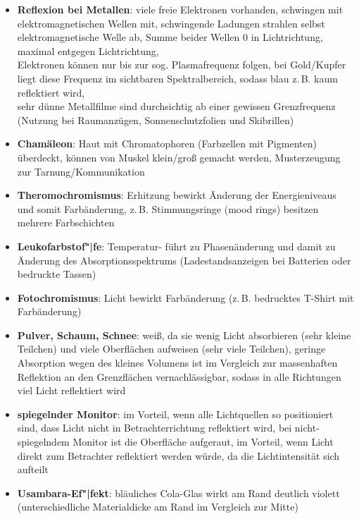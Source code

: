 \linie
\begin{itemize}
    \item
    \textbf{Reflexion bei Metallen}:
    viele freie Elektronen vorhanden, schwingen mit elektromagnetischen
    Wellen mit, schwingende Ladungen strahlen selbst elektromagnetische
    Welle ab, Summe beider Wellen $0$ in Lichtrichtung, maximal entgegen
    Lichtrichtung, \\
    Elektronen können nur bis zur sog. Plasmafrequenz folgen, bei Gold/Kupfer
    liegt diese Frequenz im sichtbaren Spektralbereich, sodass blau z.\,B.
    kaum reflektiert wird, \\
    sehr dünne Metallfilme sind durchsichtig ab einer gewissen Grenzfrequenz
    (Nutzung bei Raumanzügen, Sonnenschutzfolien und Skibrillen)
\end{itemize}
\linie
\begin{itemize}
    \item
    \textbf{Chamäleon}:
    Haut mit Chromatophoren (Farbzellen mit Pigmenten) überdeckt,
    können von Muskel klein/groß gemacht werden, Musterzeugung zur
    Tarnung/Kommunikation

    \item
    \textbf{Theromochromismus}:
    Erhitzung bewirkt Änderung der Energieniveaus und somit Farbänderung,
    z.\,B. Stimmungsringe (mood rings) besitzen mehrere Farbschichten

    \item
    \textbf{Leukofarbstof"|fe}:
    Temperatur- führt zu Phasenänderung und damit zu Änderung des
    Absorptionsspektrums (Ladestandsanzeigen bei Batterien
    oder bedruckte Tassen)

    \item
    \textbf{Fotochromismus}:
    Licht bewirkt Farbänderung (z.\,B. bedrucktes T-Shirt mit Farbänderung)
\end{itemize}
\linie
\begin{itemize}
    \item
    \textbf{Pulver, Schaum, Schnee}:
    weiß, da sie wenig Licht absorbieren (sehr kleine Teilchen) und
    viele Oberflächen aufweisen (sehr viele Teilchen), geringe Absorption wegen
    des kleines Volumens ist im Vergleich zur massenhaften Reflektion an
    den Grenzflächen vernachlässigbar, sodass in alle Richtungen viel
    Licht reflektiert wird
\end{itemize}
\linie
\begin{itemize}
    \item
    \textbf{spiegelnder Monitor}:
    im Vorteil, wenn alle Lichtquellen so positioniert sind, dass Licht nicht
    in Betrachterrichtung reflektiert wird,
    bei nicht-spiegelndem Monitor ist die Oberfläche aufgeraut,
    im Vorteil, wenn Licht direkt zum Betrachter reflektiert werden würde,
    da die Lichtintensität sich aufteilt

    \item
    \textbf{Usambara-Ef"|fekt}:
    bläuliches Cola-Glas wirkt am Rand deutlich violett
    (unterschiedliche Materialdicke am Rand im Vergleich zur Mitte)
\end{itemize}

\pagebreak
